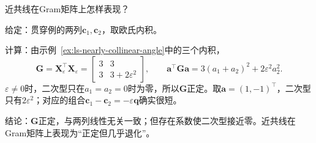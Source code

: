 近共线在Gram矩阵上怎样表现？
\begin{example}[近共线两列的Gram矩阵]
\label{ex:ls-nearly-collinear-gram}
给定：贯穿例的两列$\bm c_1,\bm c_2$，取欧氏内积。

计算：由示例~\ref{ex:ls-nearly-collinear-angle}中的三个内积，
\[
 \bm G=\bm X_\varepsilon^\top\bm X_\varepsilon=\begin{bmatrix}3&3\\3&3+2\varepsilon^2\end{bmatrix},
 \qquad
 \bm a^\top\bm G\bm a=3(a_1+a_2)^2+2\varepsilon^2a_2^2 .
\]
$\varepsilon\neq0$时，二次型只在$a_1=a_2=0$时为零，所以$\bm G$正定。取$\bm a=(1,-1)^\top$，二次型只有$2\varepsilon^2$；对应的组合$\bm c_1-\bm c_2=-\varepsilon\bm q$确实很短。

结论：$\bm G$正定，与两列线性无关一致；但存在系数使二次型接近零。近共线在Gram矩阵上表现为“正定但几乎退化”。
\end{example}

